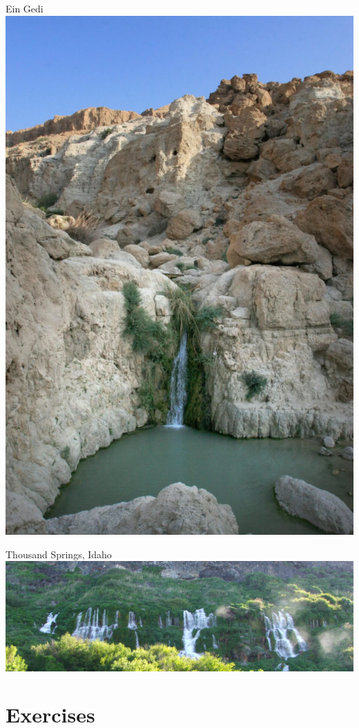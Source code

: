 \documentclass[
  letterpaper,
  DIV=11,
  numbers=noendperiod]{scrreprt}
\begin{document}
Ein Gedi \includegraphics{archive/figures/spring-ein-gedi.png}

Thousand Springs, Idaho
\includegraphics{archive/figures/spring-Thousand-Springs-Idaho.png}

\hypertarget{exercises}{%
\chapter{Exercises}\label{exercises}}
\end{document}
